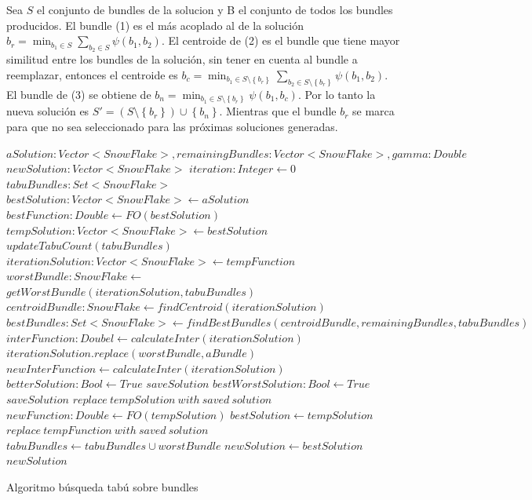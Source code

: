 Sea $S$ el conjunto de bundles de la solucion y B el conjunto de todos los bundles producidos. El bundle (1) es el más acoplado al de la solución $b_r = \min_{b_1 \in S}{\sum_{b_2 \in S}{\psi(b_1,b_2)}}$. El centroide de (2) es el bundle que tiene mayor similitud entre los bundles de la solución, sin tener en cuenta al bundle a reemplazar, entonces el centroide es $b_c = \min_{b_1 \in S \setminus \left\{b_r\right\}}{\sum_{b_2 \in S \setminus \left\{b_r\right\}}{\psi(b_1,b_2)}}$. El bundle de (3) se obtiene de $b_n = \min_{b_1 \in S \setminus \left\{b_r\right\}}{\psi(b_1,b_c)}$. Por lo tanto la nueva solución es $S' = (S \setminus \left\{b_r\right\}) \cup \left\{b_n\right\}$. Mientras que el bundle $b_r$ se marca para que no sea seleccionado para las próximas soluciones generadas.
\begin{algorithm}[H]
\begin{algorithmic}[1]
\REQUIRE $aSolution: Vector<SnowFlake>, remainingBundles: Vector<SnowFlake>, gamma: Double$
\ENSURE $newSolution:Vector<SnowFlake>$
\STATE $iteration:Integer \leftarrow 0$
\STATE $tabuBundles: Set<SnowFlake>$
\STATE $bestSolution: Vector<SnowFlake> \leftarrow aSolution$
\STATE $bestFunction:Double \leftarrow FO(bestSolution)$
\STATE $tempSolution: Vector<SnowFlake> \leftarrow bestSolution$
  \STATE $updateTabuCount(tabuBundles)$
  \STATE $iterationSolution: Vector<SnowFlake> \leftarrow tempFunction$
  \STATE $worstBundle: SnowFlake \leftarrow$\\
  $getWorstBundle(iterationSolution, tabuBundles)$
  \STATE $centroidBundle: SnowFlake \leftarrow findCentroid(iterationSolution)$
  \STATE $bestBundles: Set<SnowFlake> \leftarrow findBestBundles(centroidBundle, remainingBundles, tabuBundles)$
  \STATE $interFunction: Doubel \leftarrow calculateInter(iterationSolution)$
    \STATE $iterationSolution.replace(worstBundle, aBundle)$
    \STATE $newInterFunction \leftarrow calculateInter(iterationSolution)$
      \STATE $betterSolution: Bool \leftarrow True$
      \STATE $saveSolution$
    \ELSE
        \STATE $bestWorstSolution: Bool \leftarrow True$
        \STATE $saveSolution$
      \ENDIF
    \ENDIF
  \ENDFOR
    \STATE $replace\ tempSolution\ with\ saved\ solution$
    \STATE $newFunction: Double \leftarrow FO(tempSolution)$
      \STATE $bestSolution \leftarrow tempSolution$
    \ENDIF
  \ELSE
      \STATE $replace\ tempFunction\ with\ saved\ solution$
    \ENDIF
  \ENDIF
  \STATE $tabuBundles \leftarrow tabuBundles \cup {worstBundle}$
\ENDWHILE
\STATE $newSolution \leftarrow bestSolution$
\RETURN $newSolution$
\end{algorithmic}
\caption{Algoritmo búsqueda tabú sobre bundles}\label{alg:algBusTabuBundle}
\end{algorithm}


